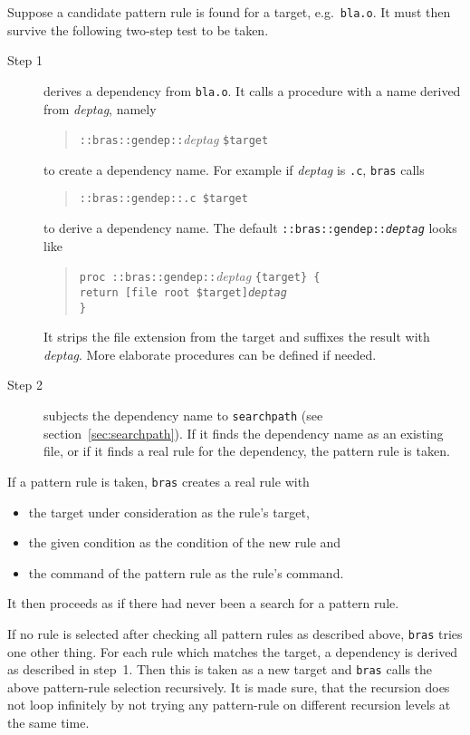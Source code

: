 \documentclass[11pt]{scrartcl}
\newcommand{\bras}{\texttt{bras}}
\begin{document}
Suppose a candidate pattern rule is found for a target, e.g.\ 
\texttt{bla.o}. It must then survive the following two-step test to be
taken.


\begin{description}
\item[Step 1] derives a dependency from \texttt{bla.o}. It calls a
  procedure with a name derived from \textit{deptag}, namely
  \begin{quote}
    \texttt{::bras::gendep::}\textit{deptag} \texttt{\$target}
  \end{quote}
  to create a dependency name. For example if \textit{deptag} is
  \texttt{.c}, \bras{} calls
  \begin{quote}
    \texttt{::bras::gendep::.c \$target}
  \end{quote}
  to derive a dependency name. The default
  \texttt{::bras::gendep::\textit{deptag}} looks like
  \begin{quote}
    \verb|proc ::bras::gendep::|\textit{deptag} \verb|{target} {|\\
      \texttt{\hspace*{2em}return [file root \$target]\textit{deptag}}\\
      \verb|}|
  \end{quote}
  It strips the file extension from the target and suffixes the result
  with \textit{deptag}. More elaborate procedures can be defined if
  needed.
  
\item[Step 2] subjects the dependency name to \texttt{searchpath} (see
  section~\ref{sec:searchpath}). If it finds the dependency name as an
  existing file, or if it finds a real rule for the dependency, the
  pattern rule is taken.
\end{description}

If a pattern rule is taken, \bras{} creates a real rule with
\begin{itemize}
\item the target under consideration as the rule's target,
\item the given condition as the condition of the new rule and
\item the command of the pattern rule as the rule's command.
\end{itemize}
It then proceeds as if there had never been a search for a pattern
rule.

If no rule is selected after checking all pattern rules as described
above, \bras{} tries one other thing. For each rule which matches the
target, a dependency is derived as described in step~1. Then this is
taken as a new target and \bras{} calls the above pattern-rule
selection recursively. It is made sure, that the recursion does not
loop infinitely by not trying any pattern-rule on different recursion
levels at the same time.
\end{document}
